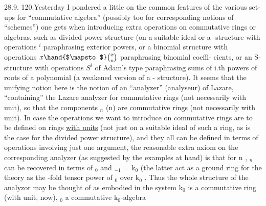 
28.9.
120.\quad Yesterday I pondered a little on the common features of the various
set-ups for ``commutative algebra'' (possibly too for corresponding notions
of ``schemes'') one gets when introducing extra operations on commutative
rings or algebras, such as divided power structure (on a suitable ideal\hand{),}
or a \hand{$\lambda$}-structure with operations \hand{$\lambda$}$^i$ paraphrasing exterior powers, or a
binomial structure with operations $x\hand{$\mapsto$}\binom{x}{n}$ paraphrasing binomial coeffi-%
cients, or an S-structure with operations $S^i$ of Adam's type paraphrasing
sums of i.th powers of roots of a polynomial (a weakened version of a \hand{$\lambda$}-%
structure). It seems that the unifying notion here is the notion of an
``analyzer'' (analyseur) of Lazare, ``containing'' the Lazare analyzer for
commutative rings (not necessarily with unit), so that the components
 \hand{$\Omega$}$_n$ (n\hand{$\geqslant$}) are commutative rings (not necessarily with unit). In case
the  operations we want to introduce on commutative rings are
to be defined on rings \uline{with units} (not just on a suitable ideal of such
a ring, as is the case for the divided power structure), and they all
can be defined in terms of operations involving just one argument, the
reasonable extra axiom on  the corresponding analyzer (as suggested by
the examples at hand) is that for n \hand{$\geqslant$} , \hand{$\Omega$}$_n$ can be recovered in terms
of \hand{$\Omega$}$_0$ and \hand{$\Omega$}$_{-1}$ = k$_0$ (the latter act as a ground ring for the theory\hand{)}
as the -fold tensor power of \hand{$\Omega$}$_0$ over k$_0$ . Thus the whole structure of
 the analyzor may be thought of as embodied in the system  
 k$_0$ is a commutative ring (with unit, now), \hand{$\Omega$}$_0$ a commutative k$_0$-algebra
